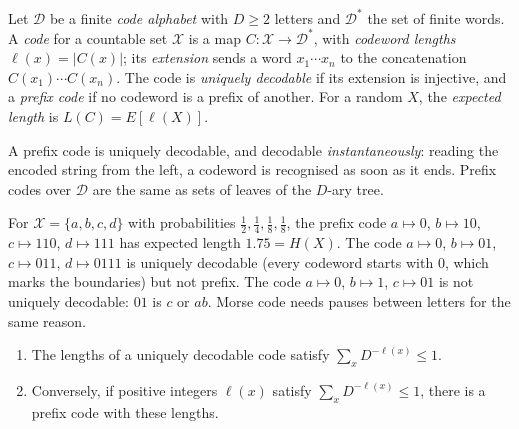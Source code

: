\begin{definition}\label{information-theory:definition-code}
Let $\mathcal{D}$ be a finite \emph{code alphabet} with $D \geq 2$ letters and $\mathcal{D}^*$ the set of finite words. A \emph{code} for a countable set $\mathcal{X}$ is a map $C \colon \mathcal{X} \to \mathcal{D}^*$, with \emph{codeword
lengths} $\ell(x) = |C(x)|$; its \emph{extension} sends a word $x_1\cdots x_n$ to the concatenation $C(x_1)\cdots C(x_n)$. The code is \emph{uniquely decodable} if its extension is injective, and a \emph{prefix code} if no
codeword is a prefix of another. For a random $X$, the \emph{expected length} is $L(C) = E[\ell(X)]$.
\end{definition}

A prefix code is uniquely decodable, and decodable \emph{instantaneously}: reading the encoded string from the left, a codeword is recognised as soon as it ends. Prefix codes over $\mathcal{D}$ are the same as sets of leaves of
the $D$-ary tree.

\begin{example}\label{information-theory:example-codes}
For $\mathcal{X} = \{a, b, c, d\}$ with probabilities $\frac12, \frac14, \frac18, \frac18$, the prefix code $a \mapsto 0$, $b \mapsto 10$, $c \mapsto 110$, $d \mapsto 111$ has expected length $1.75 = H(X)$. The code $a \mapsto 0$,
$b \mapsto 01$, $c \mapsto 011$, $d \mapsto 0111$ is uniquely decodable (every codeword starts with $0$, which marks the boundaries) but not prefix. The code $a \mapsto 0$, $b \mapsto 1$, $c \mapsto 01$ is not uniquely decodable:
$01$ is $c$ or $ab$. Morse code needs pauses between letters for the same reason.
\end{example}

\begin{theorem}\label{information-theory:theorem-kraft}
\begin{enumerate}
\item The lengths of a uniquely decodable code satisfy $\sum_xD^{-\ell(x)} \leq 1$.
\item Conversely, if positive integers $\ell(x)$ satisfy $\sum_xD^{-\ell(x)} \leq 1$, there is a prefix code with these lengths.
\end{enumerate}
\end{theorem}

